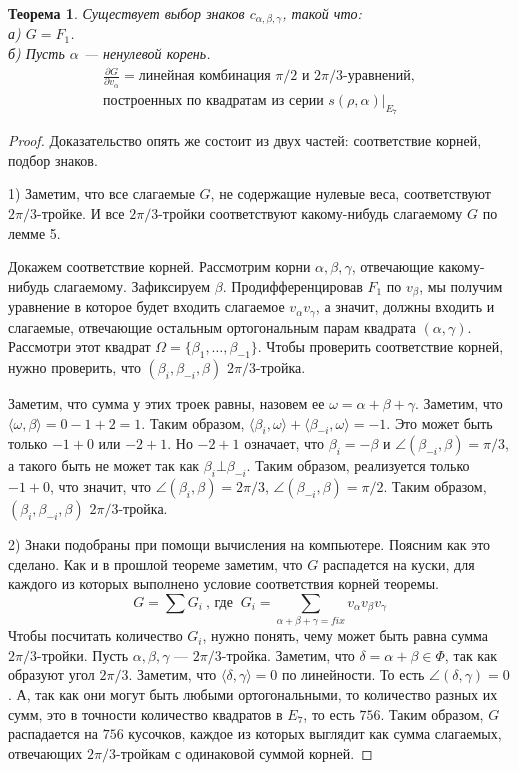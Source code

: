 \documentclass[a4paper,12pt]{amsart}
\theoremstyle{plain}
\newtheorem{theorem}{Теорема}
\theoremstyle{remark}
\theoremstyle{definition}
\begin{document}
\begin{theorem}
Существует выбор знаков  $c_{\alpha,\beta,\gamma}$, такой что:\\
а) $G = F_1$.\\
б) Пусть $\alpha$ --- ненулевой корень.
    \begin{multline*}
        \frac{\partial G}{\partial v_{\alpha}} = \text{линейная комбинация $\pi/2$ и $2\pi/3$-уравнений},\\
         \text{построенных по квадратам из серии } s(\rho, \alpha)|_{E_7}
    \end{multline*}
\end{theorem}
\begin{proof}
Доказательство  опять  же состоит  из  двух  частей:  соответствие  корней,  подбор  знаков.

1) Заметим, что все слагаемые $G$, не содержащие нулевые веса, соответствуют $2\pi/3$-тройке. И все $2\pi/3$-тройки соответствуют какому-нибудь слагаемому $G$ по лемме 5.

Докажем соответствие корней.
Рассмотрим корни $\alpha,\beta,\gamma$, отвечающие какому-нибудь слагаемому. Зафиксируем $\beta$. Продифференцировав $F_1$ по $v_\beta$, мы получим уравнение в которое будет входить слагаемое $v_{\alpha}v_{\gamma}$, а значит, должны входить и слагаемые, отвечающие остальным ортогональным парам квадрата $(\alpha,\gamma)$. Рассмотри этот квадрат $\Omega = \{\beta_1, \ldots, \beta_{-1}\}$. Чтобы проверить соответствие корней, нужно проверить, что $(\beta_i,\beta_{-i},\beta)$ $2\pi/3$-тройка.

Заметим, что сумма у этих троек равны, назовем ее $\omega=\alpha+\beta+\gamma$. Заметим, что $\langle\omega,\beta\rangle= 0-1+2 = 1$. Таким образом, $\langle\beta_i,\omega\rangle + \langle\beta_{-i},\omega\rangle = -1$. Это может быть только $-1+0$ или $-2+1$. Но $-2+1$ означает, что $\beta_i=-\beta$ и $\angle(\beta_{-i},\beta)=\pi/3$, а такого быть не может так как $\beta_i \bot \beta_{-i}$. Таким образом, реализуется только $-1+0$, что значит, что $\angle(\beta_i,\beta)=2\pi/3$, $\angle(\beta_{-i},\beta)=\pi/2$. Таким образом, $(\beta_{i},\beta_{-i},\beta)$  $2\pi/3$-тройка.

2) Знаки подобраны  при  помощи  вычисления  на  компьютере. Поясним  как это сделано. Как и в прошлой теореме заметим, что $G$ распадется на куски, для каждого из которых выполнено условие соответствия корней теоремы.
 $$G=\sum{G_i}~ \text{, где }~ G_i=\sum_{\alpha+\beta+\gamma = fix}v_{\alpha}v_{\beta}v_{\gamma}$$
 Чтобы посчитать количество $G_i$, нужно понять, чему может быть равна сумма $2\pi/3$-тройки. Пусть $\alpha,\beta,\gamma$ --- $2\pi/3$-тройка. Заметим, что $\delta = \alpha+\beta \in \Phi$, так как образуют угол $2\pi/3$. Заметим, что $\langle\delta,\gamma\rangle = 0$ по линейности. То есть $\angle(\delta,\gamma)=0$. А, так как они могут быть любыми ортогональными, то количество разных их сумм, это в точности количество квадратов в $E_7$, то есть $756$. Таким образом, $G$ распадается на $756$ кусочков, каждое из которых выглядит как сумма слагаемых, отвечающих $2\pi/3$-тройкам с одинаковой суммой корней. 
 

\end{proof}
\end{document}

